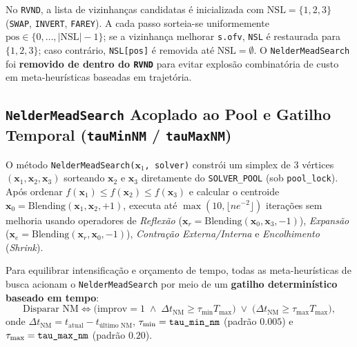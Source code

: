 \documentclass[11pt,a4paper]{article}
\begin{document}
No \texttt{RVND}, a lista de vizinhanças candidatas é inicializada com $\text{NSL} = \{1, 2, 3\}$ (\texttt{SWAP}, \texttt{INVERT}, \texttt{FAREY}). A cada passo sorteia-se uniformemente $\text{pos} \in \{0, \dots, |\text{NSL}|-1\}$; se a vizinhança melhorar \texttt{s.ofv}, \texttt{NSL} é restaurada para $\{1, 2, 3\}$; caso contrário, \texttt{NSL[pos]} é removida até $\text{NSL} = \emptyset$. O \texttt{NelderMeadSearch} foi \textbf{removido de dentro do \texttt{RVND}} para evitar explosão combinatória de custo em meta-heurísticas baseadas em trajetória.

\subsection{\texttt{NelderMeadSearch} Acoplado ao Pool e Gatilho Temporal (\texttt{tauMinNM} / \texttt{tauMaxNM})}

O método \texttt{NelderMeadSearch($\mathbf{x}_1$, solver)} constrói um simplex de 3 vértices $(\mathbf{x}_1, \mathbf{x}_2, \mathbf{x}_3)$ sorteando $\mathbf{x}_2$ e $\mathbf{x}_3$ diretamente do \texttt{SOLVER\_POOL} (sob \texttt{pool\_lock}). Após ordenar $f(\mathbf{x}_1) \le f(\mathbf{x}_2) \le f(\mathbf{x}_3)$ e calcular o centroide $\mathbf{x}_0 = \text{Blending}(\mathbf{x}_1, \mathbf{x}_2, +1)$, executa até $\max(10, \lfloor n e^{-2} \rfloor)$ iterações sem melhoria usando operadores de \emph{Reflexão} ($\mathbf{x}_r = \text{Blending}(\mathbf{x}_0, \mathbf{x}_3, -1)$), \emph{Expansão} ($\mathbf{x}_e = \text{Blending}(\mathbf{x}_r, \mathbf{x}_0, -1)$), \emph{Contração Externa/Interna} e \emph{Encolhimento} (\emph{Shrink}).

Para equilibrar intensificação e orçamento de tempo, todas as meta-heurísticas de busca acionam o \texttt{NelderMeadSearch} por meio de um \textbf{gatilho determinístico baseado em tempo}:
\begin{equation}
  \text{Disparar NM} \iff
  \big(\text{improv} = 1 \;\land\; \Delta t_{\text{NM}} \ge \tau_{\min} T_{\max}\big)
  \;\lor\;
  \big(\Delta t_{\text{NM}} \ge \tau_{\max} T_{\max}\big),
  \label{eq:gatilho_nm}
\end{equation}
onde $\Delta t_{\text{NM}} = t_{\text{atual}} - t_{\text{último NM}}$, $\tau_{\min} = \text{\texttt{tau\_min\_nm}}$ (padrão $0.005$) e $\tau_{\max} = \text{\texttt{tau\_max\_nm}}$ (padrão $0.20$).
\end{document}
